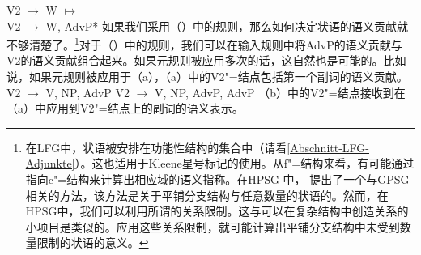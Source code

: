 \ea
\label{adv-metarule}
V2  $\to$ W $\mapsto$\\
V2  $\to$ W, AdvP*
\z 
如果我们采用（）中的规则，那么如何决定状语的语义贡献就不够清楚了。\footnote{%
  在LFG\indexlfgc 中，状语被安排在功能性结构的集合中（请看\ref{Abschnitt-LFG-Adjunkte}）。这也适用于Kleene星号标记的使用。从f"=结构来看，有可能通过指向c"=结构来计算出相应域的语义指称。在HPSG\indexhpsgc
  中， \citet{Kasper94a}提出了一个与GPSG相关的方法，该方法是关于平铺分支结构与任意数量的状语的。然而，在HPSG中，我们可以利用所谓的关系限制。这与可以在复杂结构中创造关系的小项目是类似的。应用这些关系限制，就可能计算出平铺分支结构中未受到数量限制的状语的意义。
}对于（）中的规则，我们可以在输入规则中将AdvP的语义贡献与V2的语义贡献组合起来。如果元规则被应用多次的话，这自然也是可能的。比如说，如果元规则被应用于（a），（a）中的V2"=结点包括第一个副词的语义贡献。
\eal
\ex V2 $\to$ V, NP, AdvP
\ex V2 $\to$ V, NP, AdvP, AdvP
\zl
（b）中的V2"=结点接收到在（a）中应用到V2"=结点上的副词的语义表示。

